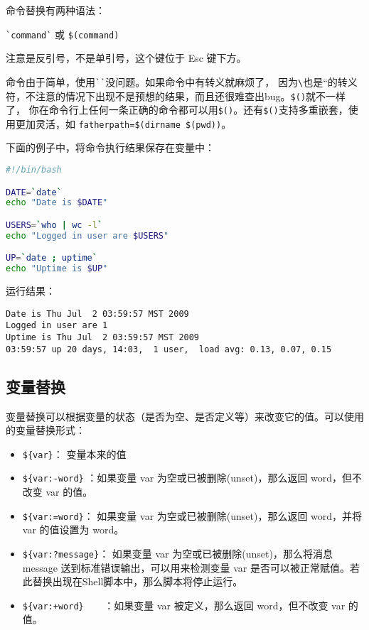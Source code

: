命令替换有两种语法：

\verb|`command`| 或 \verb|$(command)|

注意是反引号，不是单引号，这个键位于 Esc 键下方。

命令由于简单，使用\verb|``|没问题。如果命令中有转义就麻烦了， 因为\verb|\|也是``的转义符，不注意的情况下出现不是预想的结果，而且还很难查出bug。\verb|$()|就不一样了， 你在命令行上任何一条正确的命令都可以用\verb|$()|。还有\verb|$()|支持多重嵌套，使用更加灵活，如
\verb|fatherpath=$(dirname $(pwd))|。

下面的例子中，将命令执行结果保存在变量中：
\begin{lstlisting}[language=sh]
#!/bin/bash

DATE=`date`
echo "Date is $DATE"

USERS=`who | wc -l`
echo "Logged in user are $USERS"

UP=`date ; uptime`
echo "Uptime is $UP"
\end{lstlisting}

运行结果：
\begin{verbatim}
Date is Thu Jul  2 03:59:57 MST 2009
Logged in user are 1
Uptime is Thu Jul  2 03:59:57 MST 2009
03:59:57 up 20 days, 14:03,  1 user,  load avg: 0.13, 0.07, 0.15
\end{verbatim}


\subsection{变量替换}
变量替换可以根据变量的状态（是否为空、是否定义等）来改变它的值。可以使用的变量替换形式：
\begin{itemize}
\item \verb|${var}|：	变量本来的值

\item \verb|${var:-word}|	：如果变量 var 为空或已被删除(unset)，那么返回 word，但不改变 var 的值。

\item \verb|${var:=word}|：	如果变量 var 为空或已被删除(unset)，那么返回 word，并将 var 的值设置为 word。
\item \verb|${var:?message}|：	如果变量 var 为空或已被删除(unset)，那么将消息 message 送到标准错误输出，可以用来检测变量 var 是否可以被正常赋值。若此替换出现在Shell脚本中，那么脚本将停止运行。

\item \verb|${var:+word}	|：如果变量 var 被定义，那么返回 word，但不改变 var 的值。
\end{itemize}




